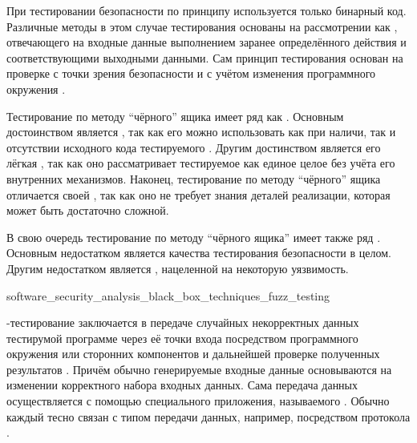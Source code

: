 %
При тестировании безопасности  по принципу  используется только бинарный код. 
%
Различные методы в этом случае тестирования основаны на рассмотрении  как , отвечающего на входные данные выполнением заранее определённого действия и соответствующими выходными данными. 
%
Сам принцип тестирования основан на проверке  с точки зрения безопасности и с учётом изменения программного окружения .

%
Тестирование по методу ``чёрного'' ящика имеет ряд как  . 
%
Основным достоинством является , так как его можно использовать как при наличи, так и отсутствии исходного кода тестируемого . 
%
Другим достинством является его лёгкая , так как оно рассматривает тестируемое  как единое целое без учёта его внутренних механизмов. 
%
Наконец, тестирование по методу ``чёрного'' ящика отличается своей , так как оно не требует знания деталей реализации, которая может быть достаточно сложной.

%
В свою очередь тестирование по методу ``чёрного ящика'' имеет также ряд  . 
%
Основным недостатком является  качества тестирования безопасности  в целом. 
%
Другим недостатком является , нацеленной на некоторую уязвимость.


	{software_security_analysis_black_box_techniques_fuzz_testing}

%
-тестирование заключается в передаче случайных некорректных данных тестирумой программе через её точки входа посредством программного окружения или сторонних компонентов и дальнейшей проверке полученных результатов . 
%
Причём обычно генерируемые входные данные основываются на изменении корректного набора входных данных. 
%
Сама передача данных осуществляется с помощью специального приложения, называемого . 
%
Обычно каждый  тесно связан с типом передачи данных, например, посредством протокола  . 

